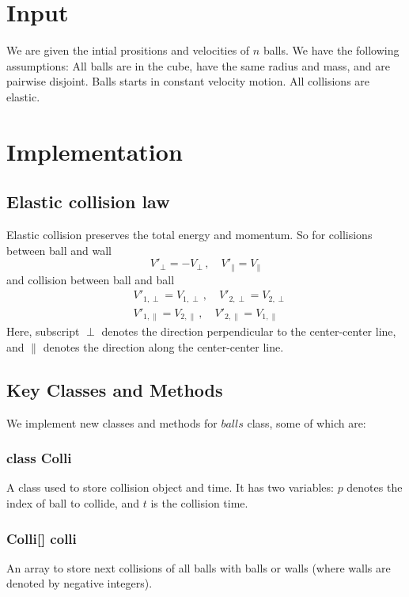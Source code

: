 \documentclass[twoside,11pt]{article}
\begin{document}
\section{Input}
We are given the intial prositions and velocities of $n$ balls. We have the following assumptions: All balls are in the cube, have the same radius and mass, and are pairwise disjoint. Balls starts in constant velocity motion. All collisions are elastic.


\section{Implementation}

\subsection{Elastic collision law}
Elastic collision preserves the total energy and momentum. So 
for collisions between ball and wall 
\begin{equation}
  \label{eq:collisionBW}
  V'_{\perp} = - V_{\perp} \,,\quad V'_{\parallel} = V_{\parallel}
\end{equation}
and collision between ball and ball
\begin{align}
  \label{eq:collisionBB}
  & V'_{1, \perp} = V_{1, \perp} \,,\quad V'_{2, \perp} = V_{2, \perp} \\
  & V'_{1, \parallel} = V_{2, \parallel} \,,\quad V'_{2, \parallel} = V_{1, \parallel}
\end{align}
Here, subscript $\perp$ denotes the direction perpendicular to the
center-center line, and $\parallel$ denotes the direction along the
center-center
line.

\subsection{Key Classes and Methods}
We implement new classes and methods for $balls$ class, some of which are:

\subsubsection{class Colli}
A class used to store collision object and time. It has two variables: $p$ denotes the index of ball to collide, and $t$ is the collision time.

\subsubsection{Colli[] colli}
An array to store next collisions of all balls with balls or walls (where walls are denoted by negative integers).
\end{document}
